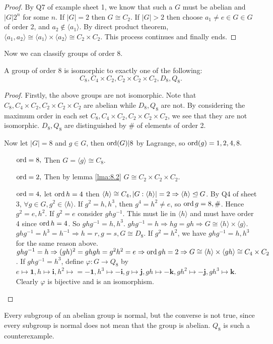 \documentclass[a4paper]{article}
\begin{document}
    \begin{proof}
        By Q7 of example sheet 1, we know that such a $G$ must be abelian and $|G|2^n$ for some $n$. If $|G|=2$ then $ G \cong C_2 $. If $|G|>2$ then choose $a_1\neq e\in G\in G$ of order 2, and $a_2\notin \langle a_1 \rangle $. By direct product theorem, $ \langle a_1,a_2 \rangle \cong \langle a_1 \rangle \times \langle a_2 \rangle \cong C_2\times C_2 $. This process continues and finally ends.
    \end{proof}
    Now we can classify groups of order 8.
    \begin{theorem}\label{thm:8.3}
        A group of order 8 is isomorphic to exactly one of the following:
        \[
            C_8, C_4 \times C_2,C_2 \times C_2 \times C_2, D_8, Q_8.
        \]
    \end{theorem}
    \begin{proof}
        Firstly, the above groups are not isomorphic. Note that $  C_8, C_4 \times C_2,C_2 \times C_2 \times C_2$ are abelian while $D_8, Q_8$ are not. By considering the maximum order in each set $ C_8, C_4 \times C_2,C_2 \times C_2 \times C_2 $, we see that they are not isomorphic. $D_8, Q_8$ are distinguished by \# of elements of order 2.

        Now let $ |G|=8 $ and $g\in G$, then $ \operatorname{ord}(G)|8 $ by Lagrange, so $ \operatorname{ord}(g)=1,2,4,8. $
        \begin{enumerate}
            \item[$ \operatorname{ord}=8 ,$] Then $ G=\langle g \rangle \cong C_8 $.
            \item[$ \operatorname{ord}=2 ,$] Then by lemma \ref{lma:8.2} $ G \cong C_2\times C_2 \times C_2 $.
            \item[$ \operatorname{ord}=4, $] let $\operatorname{ord} h=4$ then $ \langle h \rangle \cong C_4, |G:\langle h \rangle |=2 \Rightarrow \langle h \rangle \trianglelefteq G $. By Q4 of sheet 3, $ \forall g\in G, g^2\in \langle h \rangle $. If $ g^2=h,h^3 $, then $ g^4=h^2\neq e $, so $ \operatorname{ord} g=8,\# $. Hence $g^2=e,h^2$. If $g^2=e$ consider $ ghg^{-1} $. This must lie in $ \langle h \rangle $ and must have order 4 since $\operatorname{ord} h=4$. So $ ghg^{-1}=h,h^3 $. $ ghg^{-1}=h \Rightarrow hg=gh \Rightarrow G \cong \langle h \rangle \times \langle g \rangle $. $ ghg^{-1}=h^3=h^{-1} \Rightarrow h=r,g=s, G \cong D_8 $. If $g^2=h^2$, we have $ ghg^{-1}=h,h^3 $ for the same reason above. $ ghg^{-1}=h \Rightarrow (gh)^2=ghgh=g^2h^2=e \Rightarrow \operatorname{ord} gh=2 \Rightarrow G \cong \langle h \rangle \times \langle gh \rangle \cong C_4 \times C_2 $. If $ ghg^{-1}=h^3  $, define $ \varphi: G\to Q_8 $ by $ e \mapsto \mathbf{1}, h \mapsto \mathbf{i},h^2 \mapsto =-\mathbf{1}, h^3 \mapsto - \mathbf{i}, g \mapsto \mathbf{j},gh \mapsto - \mathbf{k}, gh^2 \mapsto -\mathbf{j}, gh^3 \mapsto \mathbf{k} $. Clearly $\varphi$ is bijective and is an isomorphism.
        \end{enumerate}
    \end{proof}
    \begin{remark}
        Every subgroup of an abelian group is normal, but the converse is not true, since every subgroup is normal does not mean that the group is abelian. $ Q_8 $ is such a counterexample.
    \end{remark}
\end{document}
